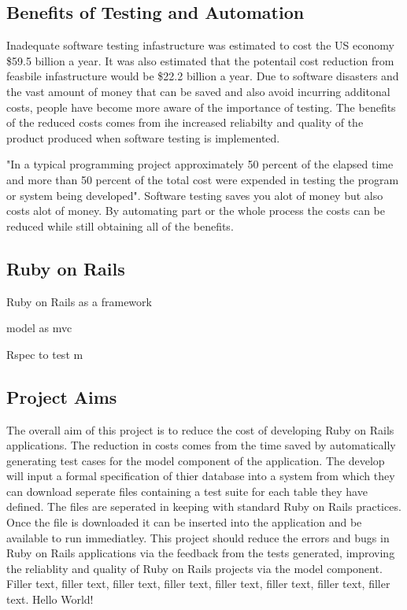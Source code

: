 \documentclass{article}
\begin{document}
\subsection{Benefits of Testing and Automation}

\par Inadequate software testing infastructure was estimated to cost the US economy \$59.5 billion a year.\cite{NISTReport} It was also estimated that the potentail cost reduction from feasbile infastructure would be \$22.2 billion a year. \cite{NISTReport} Due to software disasters and the vast amount of money that can be saved and also avoid incurring additonal costs, people have become more aware of the importance of testing. The benefits of the reduced costs  comes from ihe increased reliabilty and quality of the product produced when software testing is implemented.

\par "In a typical programming project approximately 50 percent of the elapsed time and more than 50 percent of the total cost were expended in testing the program or system being developed"\cite{myers2011art}. Software testing saves you alot of money but also costs alot of money. By automating part or the whole process the costs can be reduced while still obtaining all of the benefits.



\subsection{Ruby on Rails}
\par Ruby on Rails as a framework 
\par model as mvc
\par Rspec to test m

\subsection{Project Aims}
\par The overall aim of this project is to reduce the cost of developing Ruby on Rails applications. The reduction in costs comes from the time saved by automatically generating test cases for the model component of the application. The develop will input a formal specification of thier database into a system from which they can download seperate files containing a test suite for each table they have defined. The files are seperated in keeping with standard Ruby on Rails practices. Once the file is downloaded it can be inserted into the application and be available to run immediatley. This project should reduce the errors and bugs in Ruby on Rails applications via the feedback from the tests generated, improving the reliablity and quality of Ruby on Rails projects via the model component.
Filler text, filler text, filler text, filler text, filler text, filler text, filler text, filler text.
Hello World!
\end{document}
